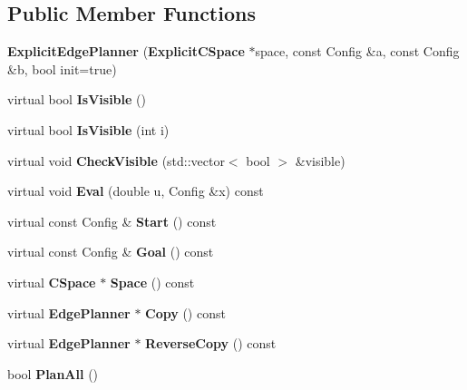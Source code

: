 \subsection*{Public Member Functions}
\begin{DoxyCompactItemize}
\item 
{\bfseries Explicit\+Edge\+Planner} ({\bf Explicit\+C\+Space} $\ast$space, const Config \&a, const Config \&b, bool init=true)\label{classExplicitEdgePlanner_a7fc6a9c3fbc0e4f207da6064c9c4df72}

\item 
virtual bool {\bfseries Is\+Visible} ()\label{classExplicitEdgePlanner_a7873eb9ad5597113338c5734a3dd03c2}

\item 
virtual bool {\bfseries Is\+Visible} (int i)\label{classExplicitEdgePlanner_a9fc5016e083f7865a52c3fa63b42a191}

\item 
virtual void {\bfseries Check\+Visible} (std\+::vector$<$ bool $>$ \&visible)\label{classExplicitEdgePlanner_a2c90b7e4529a189c13d89df0539e700a}

\item 
virtual void {\bfseries Eval} (double u, Config \&x) const \label{classExplicitEdgePlanner_a91a17a13a7a3d2495ac3b00412d04cdb}

\item 
virtual const Config \& {\bfseries Start} () const \label{classExplicitEdgePlanner_ade0d4aaf20fde1c03e3737b71d2ac032}

\item 
virtual const Config \& {\bfseries Goal} () const \label{classExplicitEdgePlanner_a4a60813bd0d83e9ca0b387aac5834a62}

\item 
virtual {\bf C\+Space} $\ast$ {\bfseries Space} () const \label{classExplicitEdgePlanner_a3fa395c82f553d4fdfc730ad271aa90e}

\item 
virtual {\bf Edge\+Planner} $\ast$ {\bfseries Copy} () const \label{classExplicitEdgePlanner_af761565d7a676e321e06f4464b67a7a4}

\item 
virtual {\bf Edge\+Planner} $\ast$ {\bfseries Reverse\+Copy} () const \label{classExplicitEdgePlanner_a4073c6d786fa30e4997e6e3819b197f2}

\item 
bool {\bfseries Plan\+All} ()\label{classExplicitEdgePlanner_aff439370c5ce1270049b623a4817dfaf}


\end{DoxyCompactItemize}
